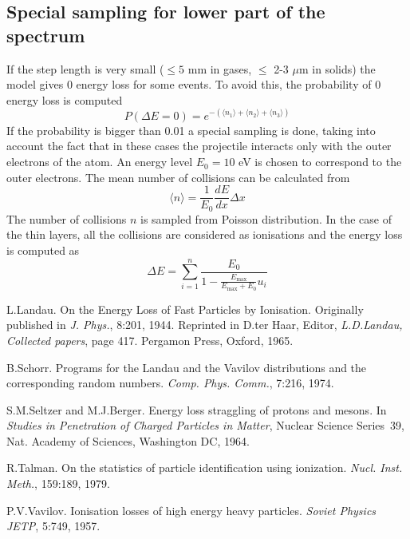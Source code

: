 \documentclass{article}
\newcommand{\Emax}{\ensuremath{E_{\mathrm{max}}}}
\begin{document}
\subsection{Special sampling for lower part of the spectrum}

If the step length is very small ($\leq 5$ mm in gases, $\leq$ 2-3
$\mu$m in solids) the model gives 0 energy loss for some events.  To
avoid this, the probability of 0 energy loss is computed
\begin{equation}
P( \Delta E=0) = e^{-( \langle n_1 \rangle + \langle n_2 \rangle
                     + \langle n_3 \rangle )}
\end{equation}
If the probability is bigger than 0.01 a special sampling is done,
taking into account the fact that in these cases the projectile
interacts only with the outer electrons of the atom.  An energy level
$E_0 = 10$ eV is chosen to correspond to the outer electrons. The mean
number of collisions can be calculated from
\begin{equation}
\langle n \rangle = \frac{1}{E_0} \frac{dE}{dx} \Delta x
\end{equation}
The number of collisions $n$ is sampled from Poisson distribution.
In the case of the thin layers, all the collisions are considered as
ionisations and the energy loss is computed as
\begin{equation}
\Delta E = \sum_{i=1}^n \frac{E_0}
          {1 - \frac {\Emax}{\Emax + E_0} u_i}
\end{equation}

\begin{thebibliography}{10}
L.Landau.
\newblock On the Energy Loss of Fast Particles by Ionisation.
\newblock Originally published in \emph{J. Phys.}, 8:201, 1944.
\newblock Reprinted in D.ter Haar, Editor, \emph{L.D.Landau, Collected
  papers}, page 417.  Pergamon Press, Oxford, 1965.

B.Schorr.
\newblock Programs for the Landau and the Vavilov distributions and the
  corresponding random numbers.
\newblock \emph{Comp. Phys. Comm.}, 7:216, 1974.

S.M.Seltzer and M.J.Berger.
\newblock Energy loss straggling of protons and mesons. 
\newblock In \emph{Studies in Penetration of Charged Particles in
  Matter}, Nuclear Science Series~39, Nat. Academy of Sciences,
  Washington DC, 1964.

R.Talman.
\newblock On the statistics of particle identification using ionization.
\newblock \emph{Nucl. Inst. Meth.}, 159:189, 1979.

P.V.Vavilov.
\newblock Ionisation losses of high energy heavy particles.
\newblock \emph{Soviet Physics JETP}, 5:749, 1957.
\end{thebibliography}
\end{document}
